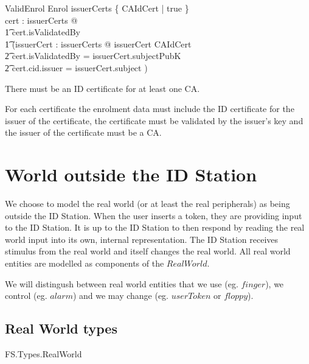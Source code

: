 \begin{schema}{ValidEnrol}
        Enrol
\where
        issuerCerts \cap \{ CAIdCert | true \} \neq \emptyset
\also
\\      \forall cert : issuerCerts @ 
\\      \t1     cert.isValidatedBy \neq \Nil 
\\      \t1     \land (\exists issuerCert : issuerCerts @ 
        issuerCert \in CAIdCert 
\\      \t2     \land \The cert.isValidatedBy = issuerCert.subjectPubK
\\      \t2     \land cert.cid.issuer = issuerCert.subject )   
\end{schema}
\begin{Zcomment}
\item
There must be an ID certificate for at least one CA.
\item
For each certificate the enrolment data must include the ID
certificate for the issuer of the certificate, the certificate must be
validated by the issuer's key and the issuer of the
certificate must be a CA.
\end{Zcomment}

\section{World outside the ID Station}
We choose to model the real world (or at least the real peripherals)
as being outside the ID Station.
When the user inserts a token, they are providing input to the ID Station.
It is up to the ID Station to then respond by reading the real world
input into its own, internal representation. The ID Station receives stimulus
from the real world and itself changes the real world. All real world
entities are modelled as components of the $RealWorld$.

We will distingush between real world entities that we use
 (eg. $finger$), we control (eg. $alarm$) 
 and we may change (eg. $userToken$ or $floppy$).


\subsection{Real World types}

\begin{traceunit}{FS.Types.RealWorld}
\end{traceunit}


